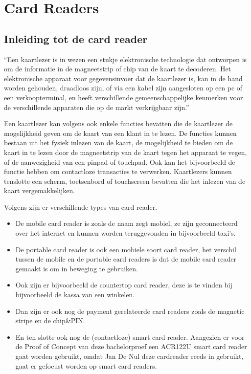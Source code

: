 \section{Card Readers}
\subsection{Inleiding tot de card reader}
``Een kaartlezer is in wezen een stukje elektronische technologie dat ontworpen is om de informatie in de magneetstrip of chip van de kaart te decoderen. Het elektronische apparaat voor gegevensinvoer dat de kaartlezer is, kan in de hand worden gehouden, draadloos zijn, of via een kabel zijn aangesloten op een pc of een verkoopterminal, en heeft verschillende gemeenschappelijke kenmerken voor de verschillende apparaten die op de markt verkrijgbaar zijn.''\autocite{MarinPenchevCardReader}

Een kaartlezer kan volgens \textcite{MarinPenchevCardReader} ook enkele functies bevatten die de kaartlezer de mogelijkheid geven om de kaart van een klant in te lezen. De functies kunnen bestaan uit het fysiek inlezen van de kaart, de mogelijkheid te bieden om de kaart in te lezen door de magneetstrip van de kaart tegen het apparaat te vegen, of de aanwezigheid van een pinpad of touchpad. Ook kan het bijvoorbeeld de functie hebben om contactloze transacties te verwerken. Kaartlezers kunnen tenslotte een scherm, toetsenbord of touchscreen bevatten die het inlezen van de kaart vergemakkelijken.

Volgens \textcite{MarinPenchevCardReader} zijn er verschillende types van card reader. 
\begin{itemize}
    \item De mobile card reader is zoals de naam zegt mobiel, ze zijn geconnecteerd over het internet en kunnen worden teruggevonden in bijvoorbeeld taxi's.
    \item De portable card reader is ook een mobiele soort card reader, het verschil tussen de mobile en de portable card readers is dat de mobile card reader gemaakt is om in beweging te gebruiken.
    \item Ook zijn er bijvoorbeeld de countertop card reader, deze is te vinden bij bijvoorbeeld de kassa van een winkelen.
    \item Dan zijn er ook nog de payment gerelateerde card readers zoals de magnetic stripe en de chip\&PIN.
    \item En ten slotte ook nog de (contactloze) smart card reader. Aangezien er voor de Proof of Concept van deze bachelorproef een ACR122U smart card reader gaat worden gebruikt, omdat Jan De Nul deze cardreader reeds in gebruikt, gaat er gefocust worden op smart card readers.
\end{itemize}





